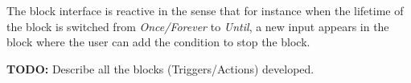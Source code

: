 The block interface is reactive in the sense that for instance when the lifetime of the block is switched from \emph{Once/Forever} to \emph{Until}, a new input appears in the block where the user can add the condition to stop the block.

\textbf{TODO: } Describe all the blocks (Triggers/Actions) developed.

